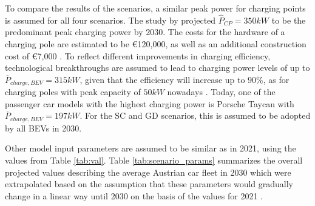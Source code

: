     To compare the results of the scenarios, a similar peak power for charging points is assumed for all four scenarios. The study by \citet{IRENA2019} projected $\hat{P}_{CP} = 350kW $ to be the predominant peak charging power by 2030. The costs for the hardware of a charging pole are estimated to be \euro120,000, as well as an additional construction cost of \euro7,000 \citep{Suomalainen2019, Baumgarte2021}. To reflect different improvements in charging efficiency, technological breakthroughs are assumed to lead to charging power levels of up to $\overline{P}_{charge, BEV} = 315kW$, given that the efficiency will increase up to $90 \%$, as for charging poles with peak capacity of $50kW$ nowadays \citep{Genovese2015}. Today, one of the passenger car models with the highest charging power is Porsche Taycan with $\overline{P}_{charge, BEV} = 197 kW$. For the SC and GD scenarios, this is assumed to be adopted by all \acp{BEV} in 2030.  
    
    Other model input parameters are assumed to be similar as in 2021, using the values from Table \ref{tab:val}. Table \ref{tab:scenario_params} summarizes the overall projected values describing the average Austrian car fleet in 2030 which were extrapolated based on the assumption that these parameters would gradually change in a linear way until 2030 on the basis of the values for 2021 . 
    

